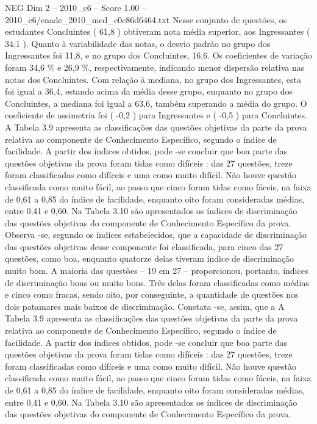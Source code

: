 \begin{textsample}{NEG Dim 2 – 2010\_c6 – Score 1.00 – 2010\_c6/enade\_2010\_med\_c0c86d6464.txt}
Nesse conjunto de questões, os estudantes Concluintes ( 61,8 ) obtiveram nota média superior, aos Ingressantes ( 34,1 ).
Quanto à variabilidade das notas, o desvio padrão no grupo dos Ingressantes foi 11,8, e no grupo dos Concluintes, 16,6.
Os coeficientes de variação foram 34,6 \% e 26,9 \%, respectivamente, indicando menor dispersão relativa nas notas dos Concluintes.
Com relação à mediana, no grupo dos Ingressantes, esta foi igual a 36,4, estando acima da média desse grupo, enquanto no grupo dos Concluintes, a mediana foi igual a 63,6, também superando a média do grupo.
O coeficiente de assimetria foi ( -0,2 ) para Ingressantes e ( -0,5 ) para Concluintes.
A Tabela 3.9 apresenta as classificações das questões objetivas da parte da prova relativa ao componente de Conhecimento Específico, segundo o índice de facilidade.
A partir dos índices obtidos, pode -se concluir que boa parte das questões objetivas da prova foram tidas como difíceis : das 27 questões, treze foram classificadas como difíceis e uma como muito difícil.
Não houve questão classificada como muito fácil, ao passo que cinco foram tidas como fáceis, na faixa de 0,61 a 0,85 do índice de facilidade, enquanto oito foram consideradas médias, entre 0,41 e 0,60.
Na Tabela 3.10 são apresentados os índices de discriminação das questões objetivas do componente de Conhecimento Específico da prova.
Observa -se, segundo os índices estabelecidos, que a capacidade de discriminação das questões objetivas desse componente foi classificada, para cinco das 27 questões, como boa, enquanto quatorze delas tiveram índice de discriminação muito bom.
A maioria das questões – 19 em 27 – proporcionou, portanto, índices de discriminação bons ou muito bons.
Três delas foram classificadas como médias e cinco como fracas, sendo oito, por conseguinte, a quantidade de questões nos dois patamares mais baixos de discriminação.
Constata -se, assim, que a A Tabela 3.9 apresenta as classificações das questões objetivas da parte da prova relativa ao componente de Conhecimento Específico, segundo o índice de facilidade.
A partir dos índices obtidos, pode -se concluir que boa parte das questões objetivas da prova foram tidas como difíceis : das 27 questões, treze foram classificadas como difíceis e uma como muito difícil.
Não houve questão classificada como muito fácil, ao passo que cinco foram tidas como fáceis, na faixa de 0,61 a 0,85 do índice de facilidade, enquanto oito foram consideradas médias, entre 0,41 e 0,60.
Na Tabela 3.10 são apresentados os índices de discriminação das questões objetivas do componente de Conhecimento Específico da prova.

\end{textsample}
